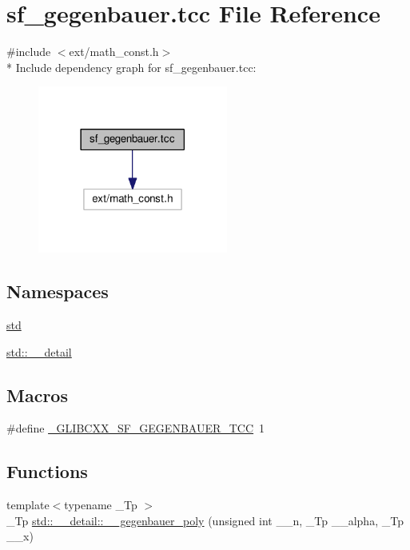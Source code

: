 \hypertarget{sf__gegenbauer_8tcc}{}\section{sf\+\_\+gegenbauer.\+tcc File Reference}
\label{sf__gegenbauer_8tcc}
{\ttfamily \#include $<$ext/math\+\_\+const.\+h$>$}\\*
Include dependency graph for sf\+\_\+gegenbauer.\+tcc\+:\nopagebreak
\begin{figure}[H]
\begin{center}
\leavevmode
\includegraphics[width=177pt]{sf__gegenbauer_8tcc__incl}
\end{center}
\end{figure}
\subsection*{Namespaces}
\begin{DoxyCompactItemize}
\item 
 \hyperlink{namespacestd}{std}
\item 
 \hyperlink{namespacestd_1_1____detail}{std\+::\+\_\+\+\_\+detail}
\end{DoxyCompactItemize}
\subsection*{Macros}
\begin{DoxyCompactItemize}
\item 
\#define \hyperlink{sf__gegenbauer_8tcc_abd7e8b1c4ef4ccdebedccbe78bb8e31b}{\+\_\+\+G\+L\+I\+B\+C\+X\+X\+\_\+\+S\+F\+\_\+\+G\+E\+G\+E\+N\+B\+A\+U\+E\+R\+\_\+\+T\+C\+C}~1
\end{DoxyCompactItemize}
\subsection*{Functions}
\begin{DoxyCompactItemize}
\item 
{\footnotesize template$<$typename \+\_\+\+Tp $>$ }\\\+\_\+\+Tp \hyperlink{namespacestd_1_1____detail_a5c2319a50d89d8067a46750708bf8563}{std\+::\+\_\+\+\_\+detail\+::\+\_\+\+\_\+gegenbauer\+\_\+poly} (unsigned int \+\_\+\+\_\+n, \+\_\+\+Tp \+\_\+\+\_\+alpha, \+\_\+\+Tp \+\_\+\+\_\+x)
\end{DoxyCompactItemize}


